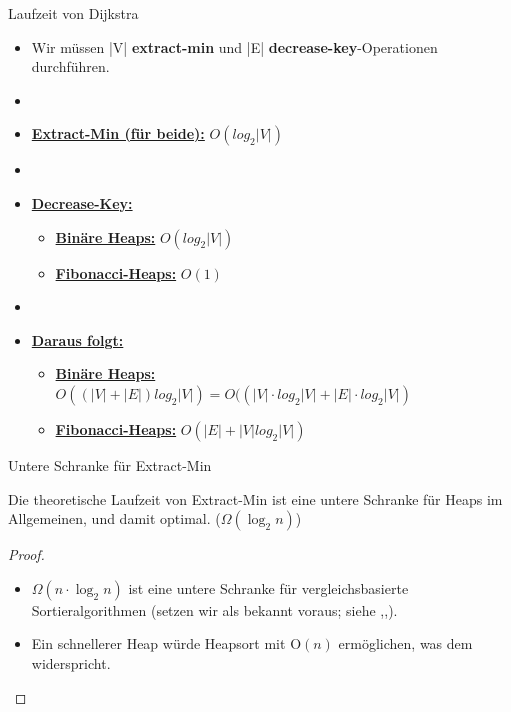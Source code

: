 \documentclass{beamer}
\newif\ifpauseswitch
\begin{document}
		\begin{frame} {Laufzeit von Dijkstra}
			\begin{itemize}
				\item Wir m\"ussen |V| \textbf{extract-min} und |E| \textbf{decrease-key}-Operationen durchf\"uhren.
				\item[] %
				\item \underline{\textbf{Extract-Min (f\"ur beide):}} $O(log_2|V|)$
				\item[] %
				\item  \underline{\textbf{Decrease-Key:}}
				\begin{itemize}
					\item  \underline{\textbf{Bin\"are Heaps:}} $O(log_2|V|)$
					\item  \underline{\textbf{Fibonacci-Heaps:}} $O(1)$
				\end{itemize}
				\item[] %
				\item  \underline{\textbf{Daraus folgt:}}
				\begin{itemize}
					\item  \underline{\textbf{Bin\"are Heaps:}}  $O((|V| + |E|) log_2|V|) = O((|V| \cdot  log_2|V| + |E| \cdot log_2|V|)$
					\item  \underline{\textbf{Fibonacci-Heaps:}} $O(|E| + |V| log_2|V|)$
				\end{itemize}
			\end{itemize}
			
		\end{frame}
		
		\begin{frame}{Untere Schranke f\"ur Extract-Min}
			\begin{theorem}
				Die theoretische Laufzeit von Extract-Min ist eine untere Schranke f\"ur Heaps im Allgemeinen, und damit optimal.
				($\Omega(\log_2 n)$)
			\end{theorem}
			\ifpauseswitch
				\pause
			\fi
			\begin{proof}
				\begin{itemize}
					\item $\Omega(n \cdot \log_2 n)$ ist eine untere Schranke für vergleichsbasierte Sortieralgorithmen (setzen wir als bekannt voraus; siehe \cite{CORMEN17},\cite{OTTMANN11},\cite{SMI21}).
					\item Ein schnellerer Heap würde Heapsort mit $\text{O}(n)$ ermöglichen, was dem widerspricht.
				\end{itemize}
			\end{proof}
		\end{frame}
	
\end{document}
